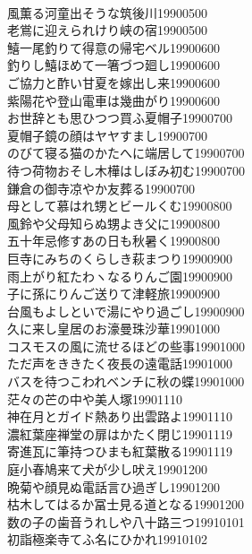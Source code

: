 \begin{multicols}{2}
\\風薫る河童出そうな筑後川\hfill{19900500}
\\老鴬に迎えられけり峡の宿\hfill{19900500}
\\鱚一尾釣りて得意の帰宅ベル\hfill{19900600}
\\釣りし鱚ほめて一箸づつ廻し\hfill{19900600}
\\ご協力と酢い甘夏を嫁出し来\hfill{19900600}
\\紫陽花や登山電車は幾曲がり\hfill{19900600}
\\お世辞とも思ひつつ買ふ夏帽子\hfill{19900700}
\\夏帽子鏡の顔はヤヤすまし\hfill{19900700}
\\のびて寝る猫のかたへに端居して\hfill{19900700}
\\待つ荷物おそし木樺はしぼみ初む\hfill{19900700}
\\鎌倉の御寺凉やか友葬る\hfill{19900700}
\\母として慕はれ甥とビールくむ\hfill{19900800}
\\風鈴や父母知らぬ甥よき父に\hfill{19900800}
\\五十年忌修すあの日も秋暑く\hfill{19900800}
\\巨寺にみちのくらしき萩まつり\hfill{19900900}
\\雨上がり紅たわヽなるりんご園\hfill{19900900}
\\子に孫にりんご送りて津軽旅\hfill{19900900}
\\台風もよしといで湯にやり過ごし\hfill{19900900}
\\久に来し皇居のお濠曼珠沙華\hfill{19901000}
\\コスモスの風に流せるほどの些事\hfill{19901000}
\\ただ声をききたく夜長の遠電話\hfill{19901000}
\\バスを待つこわれベンチに秋の蝶\hfill{19901000}
\\茫々の芒の中や美人塚\hfill{19901110}
\\神在月とガイド熱あり出雲路よ\hfill{19901110}
\\濃紅葉座禅堂の扉はかたく閉じ\hfill{19901119}
\\寄進瓦に筆持つひまも紅葉散る\hfill{19901119}
\\庭小春鳩来て犬が少し吠え\hfill{19901200}
\\晩菊や顔見ぬ電話言ひ過ぎし\hfill{19901200}
\\枯木してはるか冨士見る道となる\hfill{19901200}
\\数の子の歯音うれしや八十路三つ\hfill{19910101}
\\初詣極楽寺てふ名にひかれ\hfill{19910102}

\end{multicols}
